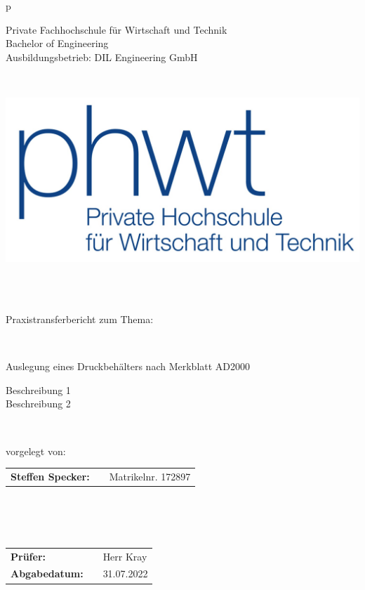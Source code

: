 \pagestyle{empty}
\begin{center}
\begin{tabular}{p{\textwidth}}
\begin{center}
\large {Private Fachhochschule für Wirtschaft und Technik \\
Bachelor of Engineering\\
Ausbildungsbetrieb: DIL Engineering GmbH}
\end{center}
\\
\begin{center}
\includegraphics[scale=1]{img/PHWT-Logo.jpg}
\end{center}
\\
\\
\begin{center}
\large{Praxistransferbericht zum Thema:}
\end{center}
\\
\begin{center}
\Large{Auslegung eines Druckbehälters nach Merkblatt AD2000}
\end{center}

\begin{center}
Beschreibung 1\\
Beschreibung 2
\end{center} \\
\begin{center}
vorgelegt von: 
\end{center}

\begin{center}
    \begin{tabular}{lll}
        \textbf{Steffen Specker:} & & Matrikelnr. 172897\\
        \end{tabular} 
\end{center}
\\
\\
\\
\begin{center}
\begin{tabular}{lll}
\textbf{Prüfer:} & & Herr Kray\\
\textbf{Abgabedatum:} & & 31.07.2022\\
\end{tabular}
\end{center}

\end{tabular}
\end{center}